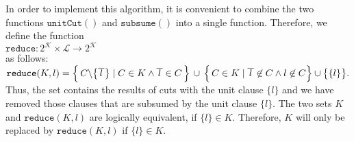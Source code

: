 In order to implement this algorithm, it is convenient to combine the two functions $\texttt{unitCut}()$ and
$\texttt{subsume}()$ into a single function. Therefore, we define the function
\\[0.2cm]
\hspace*{1.3cm}
$\texttt{reduce}: 2^\mathcal{K} \times \mathcal{L} \rightarrow 2^\mathcal{K}$
\\[0.2cm]
as follows: 
\\[0.2cm]
\hspace*{1.3cm}
$\texttt{reduce}(K,l)  = 
 \Bigl\{\, C \backslash \bigl\{\overline{\,l\,}\bigr\} \;|\; C \in K \wedge \overline{\,l\,} \in C \,\Bigr\} 
       \,\cup\, \Bigl\{\, C \in K \mid \overline{\,l\,} \not\in C \wedge l \not\in C \Bigr\} \cup \bigl\{\{l\}\bigr\}.
$
\\[0.2cm]
Thus, the set contains the results of cuts with
the unit clause $\{l\}$ and we have removed those clauses that are subsumed by the unit clause $\{l\}$.
The two sets $K$ and $\texttt{reduce}(K,l)$ are logically equivalent, if $\{l\} \in K$.
Therefore, $K$ will only be replaced by $\mathtt{reduce}(K, l)$ if $\{l\} \in K$.

